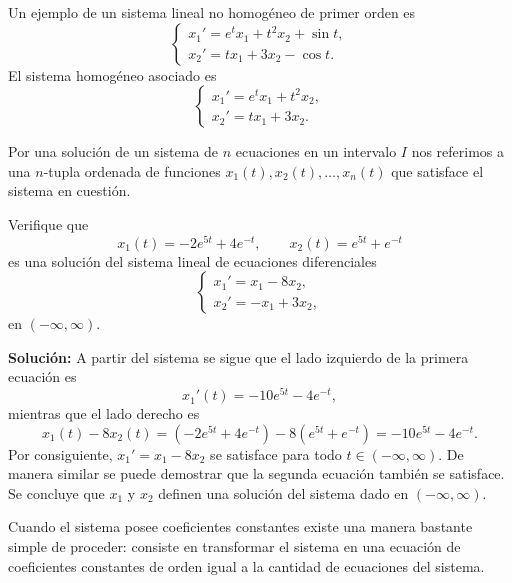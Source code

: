 \begin{example}
Un ejemplo de un sistema lineal no homog\'eneo de primer orden es
\[
\begin{cases}
x_1' = e^t x_1 + t^2 x_2 + \sin t, \\
x_2' = t x_1 + 3x_2 - \cos t.
\end{cases}
\]
El sistema homog\'eneo asociado es
\[
\begin{cases}
x_1' = e^t x_1 + t^2 x_2, \\
x_2' = t x_1 + 3x_2.
\end{cases}
\]
\end{example}

\begin{definition}
Por una soluci\'on de un sistema de $n$ ecuaciones en un intervalo $I$ nos referimos a una $n$-tupla ordenada de funciones $x_1(t),x_2(t),\dots,x_n(t)$ que satisface el sistema en cuesti\'on.
\end{definition}

\begin{example}
Verifique que
\[
x_1(t) = -2e^{5t} + 4e^{-t}, \qquad x_2(t) = e^{5t} + e^{-t}
\]
es una soluci\'on del sistema lineal de ecuaciones diferenciales
\[
\begin{cases}
x_1' = x_1 - 8x_2, \\
x_2' = -x_1 + 3x_2,
\end{cases}
\]
en $(-\infty, \infty)$.

\textbf{Soluci\'on:} A partir del sistema se sigue que el lado izquierdo de la primera ecuaci\'on es
\[
x_1'(t) = -10e^{5t} - 4e^{-t},
\]
mientras que el lado derecho es
\[
x_1(t) - 8x_2(t) = (-2e^{5t} + 4e^{-t}) - 8(e^{5t} + e^{-t}) = -10e^{5t} - 4e^{-t}.
\]
Por consiguiente, $x_1' = x_1 - 8x_2$ se satisface para todo $t \in (-\infty, \infty)$. De manera similar se puede demostrar que la segunda ecuaci\'on tambi\'en se satisface. Se concluye que $x_1$ y $x_2$ definen una soluci\'on del sistema dado en $(-\infty, \infty)$.
\end{example}

Cuando el sistema posee coeficientes constantes existe una manera bastante simple de proceder: consiste en transformar el sistema en una ecuaci\'on de coeficientes constantes de orden igual a la cantidad de ecuaciones del sistema. \\

